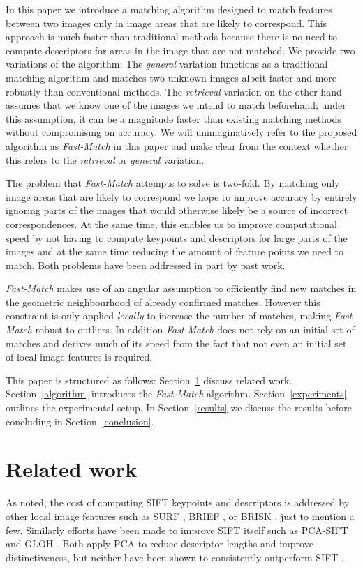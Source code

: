 \documentclass[10pt,twocolumn,letterpaper]{article}
\begin{document}
In this paper we introduce a matching algorithm designed to match features between two images only in image areas that are likely to correspond. This approach is much faster than traditional methods because there is no need to compute descriptors for areas in the image that are not matched. We provide two variations of the algorithm: The \emph{general} variation functions as a traditional matching algorithm and matches two unknown images albeit faster and more robustly than conventional methods. The \emph{retrieval} variation on the other hand assumes that we know one of the images we intend to match beforehand; under this assumption, it can be a magnitude faster than existing matching methods without compromising on accuracy. We will unimaginatively refer to the proposed algorithm as \emph{Fast-Match} in this paper and make clear from the context whether this refers to the \emph{retrieval} or \emph{general} variation.

The problem that \emph{Fast-Match} attempts to solve is two-fold. By matching only image areas that are likely to correspond we hope to improve accuracy by entirely ignoring parts of the images that would otherwise likely be a source of incorrect correspondences. At the same time, this enables us to improve computational speed by not having to compute keypoints and descriptors for large parts of the images and at the same time reducing the amount of feature points we need to match. Both problems have been addressed in part by past work. 

\emph{Fast-Match} makes use of an angular assumption to efficiently find new matches in the geometric neighbourhood of already confirmed matches. However this constraint is only applied \emph{locally} to increase the number of matches, making \emph{Fast-Match} robust to outliers. In addition \emph{Fast-Match} does not rely on an initial set of matches and derives much of its speed from the fact that not even an initial set of local image features is required.

This paper is structured as follows: Section~\ref{related} discuss related work. Section~\ref{algorithm} introduces the \emph{Fast-Match} algorithm. Section~\ref{experiments} outlines the experimental setup. In Section~\ref{results} we discuss the results before concluding in Section~\ref{conclusion}.

\section{Related work}
\label{related}
%
As noted, the cost of computing SIFT keypoints and descriptors is addressed by other local image features such as SURF \cite{bay2006surf}, BRIEF \cite{calonder2010brief}, or BRISK \cite{leutenegger2011brisk}, just to mention a few. Similarly efforts have been made to improve SIFT itself such as PCA-SIFT \cite{ke2004pca} and GLOH \cite{mikolajczyk2005performance}. Both apply PCA to reduce descriptor lengths and improve distinctiveness, but neither have been shown to consistently outperform SIFT 
\cite{mikolajczyk2005performance,li2008comprehensive}. 
\end{document}
